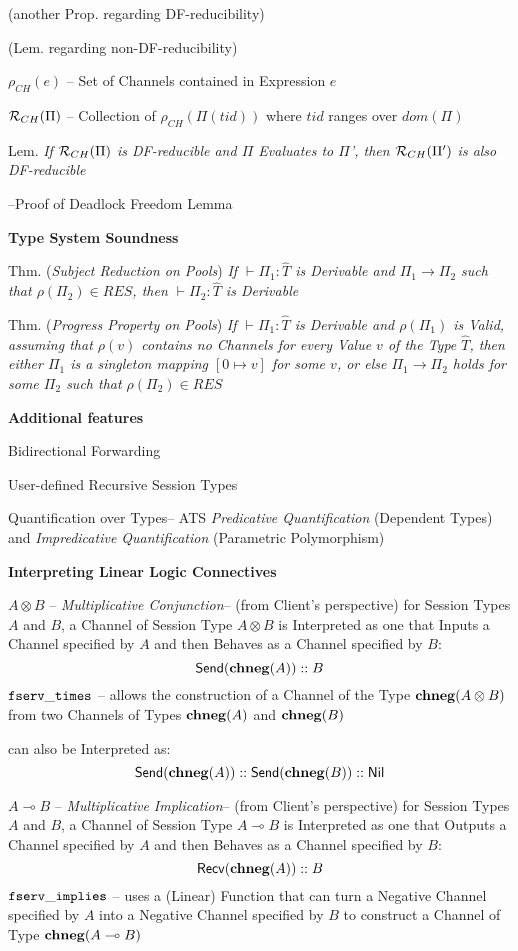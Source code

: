 (another Prop. regarding DF-reducibility) %

(Lem. regarding non-DF-reducibility) %

$\rho_{CH}(e)$ -- Set of Channels contained in Expression $e$

$\mathcal{R}_{CH}(\Pi)$ -- Collection of $\rho_{CH}(\Pi(tid))$ where
$tid$ ranges over $dom(\Pi)$

Lem. \emph{If $\mathcal{R}_{CH}(\Pi)$ is DF-reducible and $\Pi$
  Evaluates to $\Pi$', then $\mathcal{R}_{CH}(\Pi')$ is also
  DF-reducible}

--Proof of Deadlock Freedom Lemma


\textbf{Type System Soundness}

Thm. (\emph{Subject Reduction on Pools}) \emph{If $\vdash \Pi_1 :
  \hat{T}$ is Derivable and $\Pi_1 \rightarrow \Pi_2$ such that
  $\rho(\Pi_2) \in RES$, then $\vdash \Pi_2 : \hat{T}$ is Derivable}

Thm. (\emph{Progress Property on Pools}) \emph{If $\vdash \Pi_1 :
  \hat{T}$ is Derivable and $\rho(\Pi_1)$ is Valid, assuming that
  $\rho(v)$ contains no Channels for every Value $v$ of the Type
  $\hat{T}$, then either $\Pi_1$ is a singleton mapping $[0 \mapsto
    v]$ for some $v$, or else $\Pi_1 \rightarrow \Pi_2$ holds for some
  $\Pi_2$ such that $\rho(\Pi_2) \in RES$}


\textbf{Additional features}

Bidirectional Forwarding

User-defined Recursive Session Types

Quantification over Types-- ATS \emph{Predicative Quantification}
(Dependent Types) and \emph{Impredicative Quantification} (Parametric
Polymorphism)


\textbf{Interpreting Linear Logic Connectives}

$A \otimes B$ -- \emph{Multiplicative Conjunction}-- (from Client's
perspective) for Session Types $A$ and $B$, a Channel of Session Type
$A \otimes B$ is Interpreted as one that Inputs a Channel specified by
$A$ and then Behaves as a Channel specified by $B$:
\[
  \mathsf{Send}(\mathbf{chneg}(A)) :: B
\]
$\mathtt{fserv\_times}$ -- allows the construction of a Channel of the
Type $\mathbf{chneg}(A \otimes B)$ from two Channels of Types $\mathbf{chneg}(A)$ and
$\mathbf{chneg}(B)$

can also be Interpreted as:
\[
  \mathsf{Send}(\mathbf{chneg}(A)) :: \mathsf{Send}(\mathbf{chneg}(B)) :: \mathsf{Nil}
\]

$A \multimap B$ -- \emph{Multiplicative Implication}-- (from Client's
perspective) for Session Types $A$ and $B$, a Channel of Session Type
$A \multimap B$ is Interpreted as one that Outputs a Channel specified
by $A$ and then Behaves as a Channel specified by $B$:
\[
  \mathsf{Recv}(\mathbf{chneg}(A)) :: B
\]
$\mathtt{fserv\_implies}$ -- uses a (Linear) Function that can turn a
Negative Channel specified by $A$ into a Negative Channel specified by
$B$ to construct a Channel of Type $\mathbf{chneg}(A \multimap B)$

